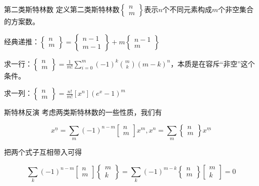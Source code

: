 \documentclass{beamer}
\begin{document}
	\begin{frame}{第二类斯特林数}
		定义第二类斯特林数$\begin{Bmatrix}n\\m\end{Bmatrix}$表示$n$个不同元素构成$m$个非空集合的方案数。
		
		经典递推：$\begin{Bmatrix}n\\m\end{Bmatrix}=\begin{Bmatrix}n-1\\m-1\end{Bmatrix}+m\begin{Bmatrix}n-1\\m\end{Bmatrix}$
		
		求一行：$\begin{Bmatrix}n\\m\end{Bmatrix}=\frac{1}{m!}\sum_{i=0}^m(-1)^k\binom{m}{k}(m-k)^n$，本质是在容斥“非空”这个条件。
		
		求一列：$\begin{Bmatrix}n\\m\end{Bmatrix}=\frac{n!}{m!}[x^n](e^x-1)^m$
	\end{frame}
	\begin{frame}{斯特林反演}
		考虑两类斯特林数的一些性质，我们有
		
		$$x^{\underline{n}}=\sum_{m}(-1)^{n-m}\begin{bmatrix}n\\m\end{bmatrix}x^m,x^n=\sum_{m}\begin{Bmatrix}n\\m\end{Bmatrix}x^{\underline{m}}$$
		
		把两个式子互相带入可得
		
		$$\sum_k(-1)^{n-m}\begin{bmatrix}n\\m\end{bmatrix}\begin{Bmatrix}m\\k\end{Bmatrix}=\sum_k(-1)^{m-k}\begin{Bmatrix}n\\m\end{Bmatrix}\begin{bmatrix}m\\k\end{bmatrix}=0$$
		
	\end{frame}
\end{document}
